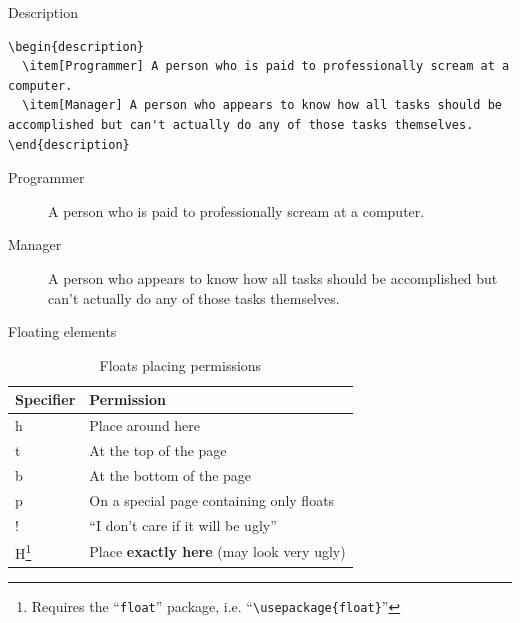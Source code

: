 \documentclass[xetex, onlymath]{beamer}
\begin{document}
\begin{frame}[fragile]{Description}
\begin{lstlisting}
\begin{description}
  \item[Programmer] A person who is paid to professionally scream at a computer.
  \item[Manager] A person who appears to know how all tasks should be accomplished but can't actually do any of those tasks themselves.
\end{description}
\end{lstlisting}

\begin{exampleblock}{}
\begin{description}
  \item[Programmer] A person who is paid to professionally scream at a computer.
  \item[Manager] A person who appears to know how all tasks should be accomplished but can't actually do any of those tasks themselves.
\end{description}
\end{exampleblock}
\end{frame}

\begin{frame}{Floating elements}
\begin{table}
	\caption{Floats placing permissions}
	\begin{tabular}{>{\ttfamily}l l}
		\toprule
		\textsf{Specifier} & Permission \\
		\midrule
		h & Place around here \\
		t & At the top of the page \\
		b & At the bottom of the page \\
		p & On a special page containing only floats \\
		! & ``I don't care if it will be ugly'' \\
		H\footnote{Requires the ``\texttt{float}'' package, i.e. 
			``\texttt{\textbackslash usepackage\{float\}}''} 
		  & Place \textbf{exactly here} (may look very ugly) \\
		\bottomrule
	\end{tabular}
\end{table}
\end{frame}
\end{document}
